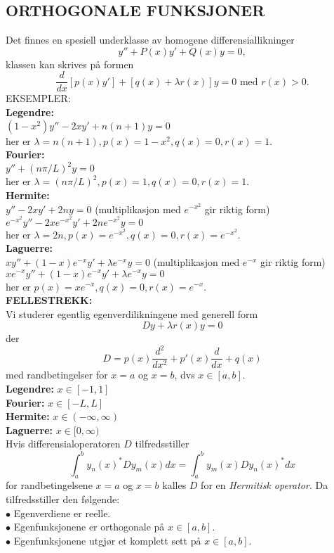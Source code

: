 \documentclass[a4paper, norsk, 8pt]{article}
\newcommand{\DIFF}[2]{ \frac{d#1}{d#2} }
\begin{document}
\begin{multicols*}{2}
\subsection*{\footnotesize ORTHOGONALE FUNKSJONER }
Det finnes en spesiell underklasse av homogene differensiallikninger
\[
y''+P(x)y'+Q(x)y=0,
\]
klassen kan skrives på formen
\[
\DIFF{}{x}\left[ p(x)y' \right]+\left[ q(x)+\lambda r(x) \right]y = 0 \mbox{ med } r(x)>0.
\]
EKSEMPLER:\\
\textbf{Legendre:} \\
$(1-x^2)y''-2xy'+n(n+1)y=0$ \\
her er $\lambda=n(n+1), p(x)=1-x^2, q(x)=0, r(x)=1$. \\
\textbf{Fourier:} \\
$y''+(n\pi/L)^2y=0$ \\
her er $\lambda=(n \pi/L)^2, p(x)=1, q(x)=0, r(x)=1$. \\
\textbf{Hermite:} \\
$y''-2xy'+2ny=0$ (multiplikasjon med $e^{-x^2}$ gir riktig form) \\
$e^{-x^2}y''-2xe^{-x^2}y'+2ne^{-x^2}y=0$ \\
her er $\lambda=2n, p(x)=e^{-x^2}, q(x)=0, r(x)=e^{-x^2}$. \\
\textbf{Laguerre:} \\
$xy''+(1-x)e^{-x}y'+\lambda e^{-x} y=0$ (multiplikasjon med $e^{-x}$ gir riktig form)\\
$xe^{-x}y''+(1-x)e^{-x}y'+\lambda e^{-x}y = 0$ \\
her er $p(x)=xe^{-x}, q(x)=0, r(x)=e^{-x}$. \\
\textbf{FELLESTREKK:}\\
Vi studerer egentlig egenverdilikningene med generell form
\[
Dy+\lambda r(x) y = 0
\]
der 
\[
D = p(x)\DIFF{^2}{x^2}+p'(x)\DIFF{}{x}+q(x)
\]
med randbetingelser for $x=a$ og $x=b$, dvs $x\in[a,b]$.\\
\textbf{Legendre:} $x\in[-1,1]$\\
\textbf{Fourier:} $x\in[-L,L]$\\
\textbf{Hermite:} $x\in(-\infty,\infty)$\\
\textbf{Laguerre:} $x\in[0,\infty)$\\
Hvis differensialoperatoren $D$ tilfredsstiller
\[
\int_{a}^{b}y_n(x)^*D y_m(x) dx = \int_{a}^{b} y_m(x) D y_n(x)^* dx
\]
for randbetingelsene $x=a$ og $x=b$ kalles $D$ for en \textit{Hermitisk operator}. Da tilfredsstiller den følgende: \\
$\bullet$ Egenverdiene er reelle. \\
$\bullet$ Egenfunksjonene er orthogonale på $x\in[a,b]$. \\
$\bullet$ Egenfunksjonene utgjør et komplett sett på $x\in[a,b]$. \\

\end{multicols*}
\end{document}
